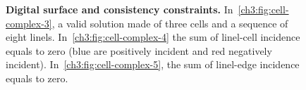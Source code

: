 \begin{figure}
\center
\hspace{0.5em}
\hspace{0.5em}
\caption{\textbf{Digital surface and consistency constraints.} In~\cref{ch3:fig:cell-complex-3}, a valid solution made of three cells and a sequence of eight linels. In~\cref{ch3:fig:cell-complex-4} the sum of linel-cell incidence equals to zero (blue are positively incident and red negatively incident). In~\cref{ch3:fig:cell-complex-5}, the sum of linel-edge incidence equals to zero.}
\label{ch3:fig:schoenemann-consistency-constraints}
\end{figure}


